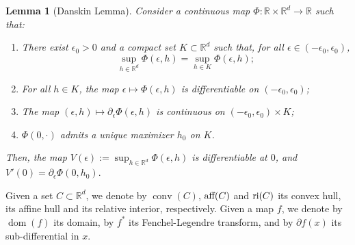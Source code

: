 \documentclass[reqno, a4paper]{amsart}
\theoremstyle{plain}
\newtheorem{lemma}[theorem]{Lemma}
\theoremstyle{definition}
\theoremstyle{remark}
\numberwithin{equation}{section}
\numberwithin{theorem}{section}
\newcommand{\R}{\mathbb{R}}
\newcommand{\conv}{\operatorname{conv}}
\newcommand{\aff}{\textnormal{aff}}
\newcommand{\dom}{\operatorname{dom}}
\begin{document}
	\begin{lemma}[Danskin Lemma]\label{lem:danskin_local}
		Consider a continuous map $\Phi:\R\times \R^d \to\R$  such that:
		
		\begin{enumerate}
			\item\label{point:Danskin_loc}  There exist $\epsilon_0> 0$ and a compact set $K \subset \R^d$ such that, for all $\epsilon \in (-\epsilon_0,\epsilon_0)$,
			\[
			\sup_{h\in \R^d}\Phi(\epsilon,h)=\sup_{h\in K}\Phi(\epsilon,h);
			\]
			\item\label{point:Danskin_diff} For all $h\in K$, the map $\epsilon\mapsto \Phi(\epsilon,h)$ is differentiable on $(-\epsilon_0,\epsilon_0)$;
			\item\label{point:Danskin_C_1} The map $(\epsilon,h)\mapsto \partial_\epsilon\Phi(\epsilon,h)$ is continuous on $(-\epsilon_0,\epsilon_0) \times K$;
			\item\label{point:Danskin_uniqueness} $\Phi(0,\cdot)$ admits a unique maximizer $h_0$ on $K$.
		\end{enumerate}
		Then, the map $V(\epsilon):=\sup_{h\in \R^d}\Phi(\epsilon,h)$ is differentiable at $0$, and	$V'(0)=\partial_\epsilon\Phi(0,h_0).$
	\end{lemma}
	
	Given a set $C \subset \R^d$, we denote by $\conv(C)$, $\aff(C)$ and $\textnormal{ri}(C)$ its convex hull, its affine hull and its relative interior, respectively. Given a map $f$, we denote by $\dom(f)$ its domain, by $f^*$ its Fenchel-Legendre transform, and by $\partial f (x)$ its sub-differential in $x$. 
	
\end{document}
